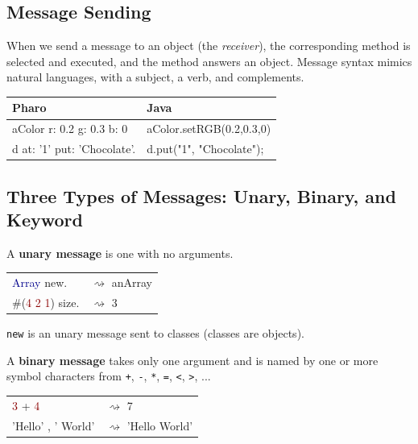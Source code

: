 \documentclass[notumble]{leaflet}
\newcommand{\code}[1]{\foreignlanguage{english}{\texttt{#1}}}
\begin{document}

\subsection{Message Sending}
When we send a message to an object (the \emph{receiver}), the corresponding method is selected and executed, and the method answers an object. Message syntax mimics natural languages, with a subject, a verb, and complements.



\noindent
\begin{tabularx}{\linewidth}{@{}lX@{}}
        \toprule
        \textbf{Pharo} & \textbf{Java}\\
\midrule
aColor r: 0.2 g: 0.3 b: 0&aColor.setRGB(0.2,0.3,0)\\
d at: '1' put: 'Chocolate'.&d.put("1", "Chocolate");\\
\midrule
\end{tabularx}

\vspace{-0.3cm}
\subsection{Three Types of Messages: Unary, Binary, and Keyword}

A \textbf{unary message} is one with no arguments.

\noindent
\begin{tabularx}{\linewidth}{@{}lX@{}}
        \toprule
      \textcolor{darkBlue}{Array} new.& $\rightsquigarrow$ anArray \\
      \#(\textcolor{darkRed}{4 2 1}) size.& $\rightsquigarrow$ 3\\
       \midrule
\end{tabularx}

\code{new} is an unary message sent to classes (classes are objects). 

A \textbf{binary message} takes only one
argument and is named by one or more symbol characters from \code{+}, \code{-}, \code{*}, \code{=}, \code{<}, \code{>}, ...

\noindent
\begin{tabularx}{\linewidth}{@{}lX@{}}
        \toprule
      \textcolor{darkRed}{3} + \textcolor{darkRed}{4}& $\rightsquigarrow$ 7 \\
     \textcolor{string}{'Hello'} , \textcolor{string}{' World'}& $\rightsquigarrow$ 'Hello World'\\
       \midrule
\end{tabularx}
\end{document}
